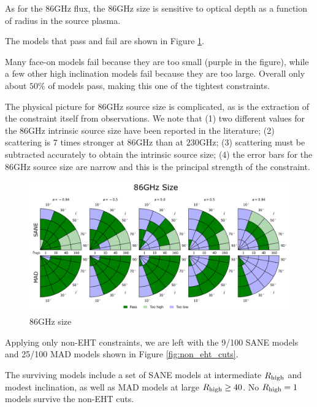 As for the $86$GHz flux, the $86$GHz size is sensitive to optical depth as a function of radius in the source plasma.

The models that pass and fail are shown in Figure \ref{fig:cmp_86ghz_size}.

Many face-on models fail because they are too small (purple in the figure), while a few other high inclination models fail because they are too large.  Overall only about $50\%$ of models pass, making this one of the tightest constraints.

The physical picture for 86GHz source size is complicated, as is the extraction of the constraint itself from observations.  We note that (1) two different values for the 86GHz intrinsic source size have been reported in the literature; (2) scattering is $7$ times stronger at $86$GHz than at $230$GHz; (3) scattering must be subtracted accurately to obtain the intrinsic source size; (4) the error bars for the 86GHz source size are narrow and this is the principal strength of the constraint.

\begin{figure}
  \centering
  \includegraphics[width=\columnwidth]{./figures/86GHz_size_Constraints.png}
  \caption{86GHz size}
  \label{fig:cmp_86ghz_size}
\end{figure}


Applying only non-EHT constraints, we are left with the 9/100 SANE models and 25/100 MAD models shown in Figure \ref{fig:non_eht_cuts}.

The surviving models include a set of SANE models at intermediate $R_\mathrm{high}$ and modest inclination, as well as MAD models at large $R_\mathrm{high} \ge 40$.  No $R_\mathrm{high} = 1$ models survive the non-EHT cuts.

